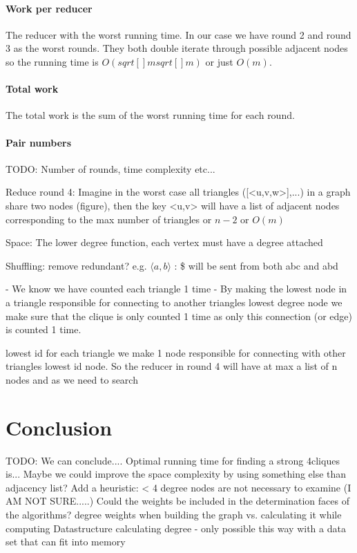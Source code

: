\documentclass{article}
\begin{document}
\paragraph{Work per reducer}
The reducer with the worst running time. In our case we have round 2 and round 3 as the worst rounds. They both double iterate through possible adjacent nodes so the running time is $O(sqrt[]{m}sqrt[]{m})$ or just $O(m)$.

\paragraph{Total work}
The total work is the sum of the worst running time for each round. 

\paragraph{Pair numbers}


TODO: Number of rounds, time complexity etc...

Reduce round 4: Imagine in the worst case all triangles ([<u,v,w>],...) in a graph share two nodes (figure), then the key <u,v> will have a list of adjacent nodes corresponding to the max number of triangles or $n-2$ or $O(m)$

Space: The lower degree function, each vertex must have a degree attached

Shuffling: remove redundant? e.g. $\langle a,b\rangle$ : \$ will be sent from both abc and abd

- We know we have counted each triangle 1 time
- By making the lowest node in a triangle responsible for connecting to another triangles lowest degree node we make sure that the clique is only counted 1 time as only this connection (or edge) is counted 1 time.

lowest id
for each triangle we make 1 node responsible for connecting with other triangles lowest id node. So the reducer in round 4 will have at max a list of n nodes and as we need to search



\section{Conclusion}
TODO: We can conclude....
Optimal running time for finding a strong 4cliques is...
Maybe we could improve the space complexity by using something else than adjacency list?
Add a heuristic: < 4 degree nodes are not necessary to examine (I AM NOT SURE.....)
Could the weights be included in the determination faces of the algorithms?
degree weights when building the graph vs. calculating it while computing
Datastructure calculating degree - only possible this way with a data set that can fit into memory
\end{document}
